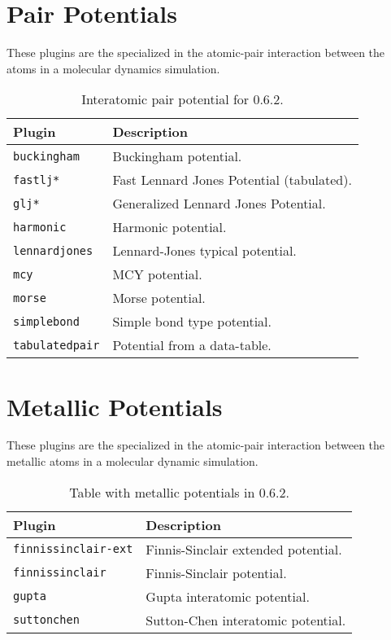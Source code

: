 \section{Pair Potentials}
These plugins are the specialized in the atomic-pair interaction between the
atoms in a molecular dynamics simulation.

\begin{table}[h!]\centering
 \begin{tabular}{|l|p{10cm}|}\hline
 Plugin & Description \\
 \hline\hline
 \texttt{buckingham} & Buckingham potential.\\
 \hline
 \texttt{fastlj*} & Fast Lennard Jones Potential (tabulated). \\
 \hline
 \texttt{glj*} & Generalized Lennard Jones Potential. \\
 \hline
 \texttt{harmonic} & Harmonic potential.\\
 \hline
 \texttt{lennardjones} & Lennard-Jones typical potential.\\
 \hline
 \texttt{mcy} & MCY potential.\\
 \hline
 \texttt{morse} & Morse potential.\\
 \hline
 \texttt{simplebond} & Simple bond type potential.\\
 \hline
 \texttt{tabulatedpair} & Potential from a data-table.\\
 \hline
 \end{tabular}
\label{tab:modpotentials}
\caption{Interatomic pair potential for {\lpmd} 0.6.2.}
\end{table}

\section{Metallic Potentials}
These plugins are the specialized in the atomic-pair interaction between the
metallic atoms in a molecular dynamic simulation.

\begin{table}[h!]\centering
 \begin{tabular}{|l|p{13cm}|}\hline
 Plugin & Description \\
 \hline\hline
 \texttt{finnissinclair-ext} & Finnis-Sinclair extended potential.\\
 \hline
 \texttt{finnissinclair} & Finnis-Sinclair potential.\\
 \hline
 \texttt{gupta} & Gupta interatomic potential.\\
 \hline
 \texttt{suttonchen} & Sutton-Chen interatomic potential.\\
 \hline
 \end{tabular}
\label{tab:modmetalpotentials}
\caption{Table with metallic potentials in {\lpmd} 0.6.2.}
\end{table}


